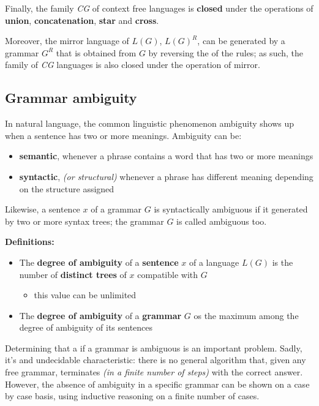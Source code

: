 \documentclass[english]{article}
\begin{document}
Finally, the family \textit{CG} of context free languages is \textbf{closed} under the operations of \textbf{union}, \textbf{concatenation}, \textbf{star} and \textbf{cross}.

Moreover, the mirror language of \(L(G)\), \(L(G)^R\), can be generated by a grammar \(G^R\) that is obtained from \(G\) by reversing the \RP of the rules; as such, the family of \textit{CG} languages is also closed under the operation of mirror.

\subsection{Grammar ambiguity}
\label{sec:grammar-ambiguity}

In natural language, the common linguistic phenomenon ambiguity shows up when a sentence has two or more meanings.
Ambiguity can be:

\begin{itemize}
  \item \textbf{semantic}, whenever a phrase contains a word that has two or more meanings
  \item \textbf{syntactic}, \textit{(or structural)} whenever a phrase has different meaning depending on the structure assigned
\end{itemize}

Likewise, a sentence \(x\) of a grammar \(G\) is syntactically ambiguous if it generated by two or more syntax trees;
the grammar \(G\) is called ambiguous too.

\bigskip
\textbf{Definitions:}

\begin{itemize}
  \item The \textbf{degree of ambiguity} of a \textbf{sentence} \(x\) of a language \(L(G)\) is the number of \textbf{distinct trees} of \(x\) compatible with \(G\)
        \begin{itemize}
          \item this value can be unlimited
        \end{itemize}
  \item The \textbf{degree of ambiguity} of a \textbf{grammar} \(G\) os the maximum among the degree of ambiguity of its sentences
\end{itemize}

\bigskip
Determining that a if a grammar is ambiguous is an important problem.
Sadly, it's and undecidable characteristic: there is no general algorithm that, given any free grammar, terminates \textit{(in a finite number of steps)} with the correct answer.
However, the absence of ambiguity in a specific grammar can be shown on a case by case basis, using inductive reasoning on a finite number of cases.
\end{document}
